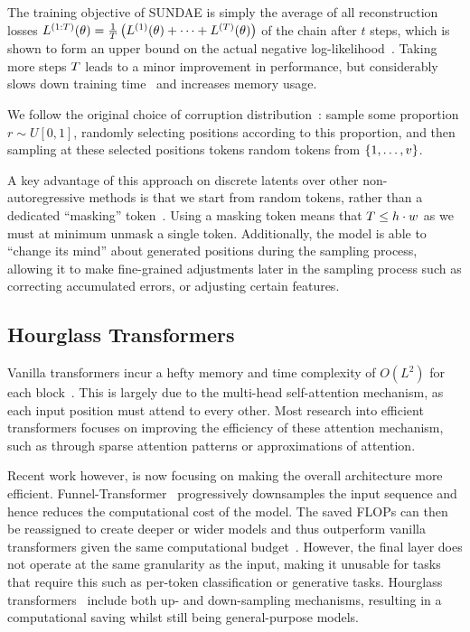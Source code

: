 The training objective of SUNDAE is simply the average of all reconstruction
losses $L^{(1:T)}(\theta) = \frac{1}{T} \left(L^{(1)}(\theta) + \dots +
L^{(T)}(\theta) \right)$ of the chain after $t$ steps, which is shown to form
an upper bound on the actual negative
log-likelihood~\cite{savinov2022stepunrolled}. Taking more steps $T$
leads to a minor improvement in performance, but considerably slows down
training time~\cite{savinov2022stepunrolled} and increases memory usage.

We follow the original choice of corruption
distribution~\cite{savinov2022stepunrolled}: sample some
proportion $r \sim U[0, 1]$, randomly selecting positions according to this
proportion, and then sampling at these selected positions tokens random tokens
from $\{1, \dots, v\}$.

A key advantage of this approach on discrete latents over other
non-autoregressive methods is that we start from random tokens, rather than a
dedicated ``masking'' token~\cite{bondtaylor2021unleashing}. Using a masking
token means that $T \leq h\cdot w$ as we must at minimum unmask a single
token. Additionally, the model is able to ``change its mind'' about generated
positions during the sampling process, allowing it to make fine-grained
adjustments later in the sampling process such as correcting accumulated errors,
or adjusting certain features.


\subsection{Hourglass Transformers}
\label{subsec:hourglass}

Vanilla transformers incur a hefty memory and time complexity of $O(L^2)$ for
each block~\cite{vaswani2017attention}. This is largely due to the multi-head
self-attention mechanism, as each input position must attend to every other.
Most research into efficient transformers focuses on improving the efficiency of
these attention mechanism, such as through sparse attention patterns or
approximations of attention.

Recent work however, is now focusing on making the overall architecture more
efficient. Funnel-Transformer~\cite{dai2020funneltransformer} progressively
downsamples the input sequence and hence reduces the computational cost of the
model. The saved FLOPs can then be reassigned to create deeper or wider models
and thus outperform vanilla transformers given the same computational
budget~\cite{dai2020funneltransformer}. However, the final layer does not
operate at the same granularity as the input, making it unusable for tasks that
require this such as per-token classification or generative tasks. Hourglass
transformers~\cite{nawrot2021hierarchical} include both up- and down-sampling
mechanisms, resulting in a computational saving whilst still being
general-purpose models.
